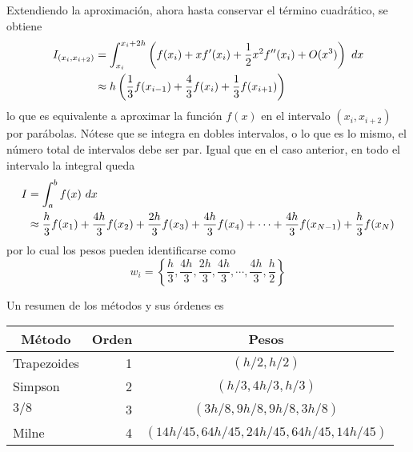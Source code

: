 \documentclass[spanish,titlepage,11pt]{article}
\begin{document}
Extendiendo la aproximaci\'{o}n, ahora hasta conservar el t\'{e}rmino
cuadr\'{a}tico, se obtiene
\begin{align}
I_{\left(  x_{i},x_{i+2}\right)  } &  =\int_{x_{i}}^{x_{i}+2h}\left(
f(x_{i})+xf^{\prime}(x_{i})+\dfrac{1}{2}x^{2}f^{\prime\prime}(x_{i}%
)+O(x^{3})\right)  \ {\normalsize d}x\\
&  \approx h\left(  \dfrac{1}{3}f(x_{i-1})+\dfrac{4}{3}f(x_{i})+\dfrac{1}%
{3}f(x_{i+1})\right)
\end{align}
lo que es equivalente a aproximar la funci\'{o}n $f(x)$ en el intervalo
$\left(  x_{i},x_{i+2}\right)  $ por par\'{a}bolas. N\'{o}tese que se integra
en dobles intervalos, o lo que es lo mismo, el n\'{u}mero total de intervalos
debe ser par. Igual que en el caso anterior, en todo el intervalo la integral
queda
\begin{align}
I &  =\int_{a}^{b}f(x)\ {\normalsize d}x\\
&  \approx\dfrac{h}{3}f(x_{1})+\dfrac{4h}{3}f(x_{2})+\dfrac{2h}{3}%
f(x_{3})+\dfrac{4h}{3}f(x_{4})+\cdots+\dfrac{4h}{3}f(x_{N-1})+\dfrac{h}%
{3}f(x_{N})
\end{align}
por lo cual los pesos pueden identificarse como
\begin{equation}
w_{i}=\left\{  \dfrac{h}{3},\dfrac{4h}{3},\dfrac{2h}{3},\dfrac{4h}{3}%
,\cdots,\dfrac{4h}{3},\dfrac{h}{2}\right\}
\end{equation}

Un resumen de los m\'{e}todos y sus \'{o}rdenes es

\begin{center}%
\begin{tabular}
[c]{ccc}\hline\hline
\textbf{M\'{e}todo} & \textbf{Orden} & \textbf{Pesos}\\\hline\hline
\multicolumn{1}{l}{Trapezoides} & \multicolumn{1}{r}{1} & $\left(
h/2,h/2\right)  $\\
\multicolumn{1}{l}{Simpson} & \multicolumn{1}{r}{2} & $\left(
h/3,4h/3,h/3\right)  $\\
\multicolumn{1}{l}{$3/8$} & \multicolumn{1}{r}{3} & $\left(
3h/8,9h/8,9h/8,3h/8\right)  $\\
\multicolumn{1}{l}{Milne} & \multicolumn{1}{r}{4} & $\left(
14h/45,64h/45,24h/45,64h/45,14h/45\right)  $%
\end{tabular}
\end{center}
\end{document}
